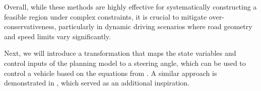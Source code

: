 Overall, while these methods are highly effective for systematically constructing a feasible region under complex constraints, it is crucial to
mitigate over-conservativeness, particularly in dynamic driving scenarios where road geometry and speed limits vary significantly.

Next, we will introduce a transformation that maps the state variables and control inputs of the planning model to a steering angle, which can be
used to control a vehicle based on the equations from \cite{eilbrecht_challenges_2020}.
A similar approach is demonstrated in \cite{werling_optimal_2010}, which served as an additional inspiration.
